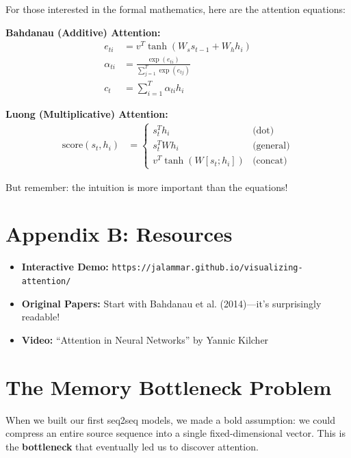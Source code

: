 \documentclass{article}
\begin{document}
For those interested in the formal mathematics, here are the attention equations:

\textbf{Bahdanau (Additive) Attention:}
\begin{align}
e_{ti} &= v^T \tanh(W_s s_{t-1} + W_h h_i) \\
\alpha_{ti} &= \frac{\exp(e_{ti})}{\sum_{j=1}^T \exp(e_{tj})} \\
c_t &= \sum_{i=1}^T \alpha_{ti} h_i
\end{align}

\textbf{Luong (Multiplicative) Attention:}
\begin{align}
\text{score}(s_t, h_i) &= \begin{cases}
s_t^T h_i & \text{(dot)} \\
s_t^T W h_i & \text{(general)} \\
v^T \tanh(W[s_t; h_i]) & \text{(concat)}
\end{cases}
\end{align}

But remember: the intuition is more important than the equations!

\section*{Appendix B: Resources}

\begin{itemize}
\item \textbf{Interactive Demo:} \texttt{https://jalammar.github.io/visualizing-attention/}
\item \textbf{Original Papers:} Start with Bahdanau et al. (2014)---it's surprisingly readable!
\item \textbf{Video:} ``Attention in Neural Networks'' by Yannic Kilcher
\end{itemize}




\section{The Memory Bottleneck Problem}

When we built our first seq2seq models, we made a bold assumption: we could compress an entire source sequence into a single fixed-dimensional vector. This is the \textbf{bottleneck} that eventually led us to discover attention.

\end{document}
